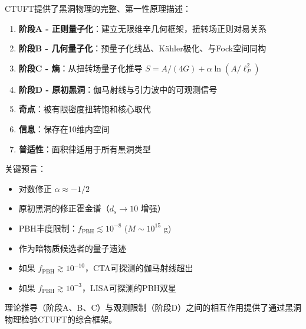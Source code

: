 CTUFT提供了黑洞物理的完整、第一性原理描述：

\begin{enumerate}
    \item \textbf{阶段A - 正则量子化}：建立无限维辛几何框架，扭转场正则对易关系
    \item \textbf{阶段B - 几何量子化}：预量子化线丛、Kähler极化、与Fock空间同构
    \item \textbf{阶段C - 熵}：从扭转场量子化推导 $S = A/(4G) + \alpha\ln(A/\ell_P^2)$
    \item \textbf{阶段D - 原初黑洞}：伽马射线与引力波中的可观测信号
    \item \textbf{奇点}：被有限密度扭转饱和核心取代
    \item \textbf{信息}：保存在10维内空间
    \item \textbf{普适性}：面积律适用于所有黑洞类型
\end{enumerate}

关键预言：
\begin{itemize}
    \item 对数修正 $\alpha \approx -1/2$
    \item 原初黑洞的修正霍金谱（$d_s \to 10$ 增强）
    \item PBH丰度限制：$f_{\text{PBH}} \lesssim 10^{-8}$ ($M \sim 10^{15}$ g)
    \item 作为暗物质候选者的量子遗迹
    \item 如果 $f_{\text{PBH}} \gtrsim 10^{-10}$，CTA可探测的伽马射线超出
    \item 如果 $f_{\text{PBH}} \gtrsim 10^{-3}$，LISA可探测的PBH双星
\end{itemize}

理论推导（阶段A、B、C）与观测限制（阶段D）之间的相互作用提供了通过黑洞物理检验CTUFT的综合框架。
